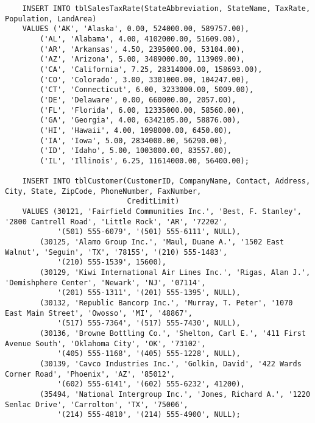 \documentclass[12pt,titlepage]{article}
\begin{document}
\begin{verbatim}
    INSERT INTO tblSalesTaxRate(StateAbbreviation, StateName, TaxRate, Population, LandArea)
    VALUES ('AK', 'Alaska', 0.00, 524000.00, 589757.00),
        ('AL', 'Alabama', 4.00, 4102000.00, 51609.00),
        ('AR', 'Arkansas', 4.50, 2395000.00, 53104.00),
        ('AZ', 'Arizona', 5.00, 3489000.00, 113909.00),
        ('CA', 'California', 7.25, 28314000.00, 158693.00),
        ('CO', 'Colorado', 3.00, 3301000.00, 104247.00),
        ('CT', 'Connecticut', 6.00, 3233000.00, 5009.00),
        ('DE', 'Delaware', 0.00, 660000.00, 2057.00),
        ('FL', 'Florida', 6.00, 12335000.00, 58560.00),
        ('GA', 'Georgia', 4.00, 6342105.00, 58876.00),
        ('HI', 'Hawaii', 4.00, 1098000.00, 6450.00),
        ('IA', 'Iowa', 5.00, 2834000.00, 56290.00),
        ('ID', 'Idaho', 5.00, 1003000.00, 83557.00),
        ('IL', 'Illinois', 6.25, 11614000.00, 56400.00);

    INSERT INTO tblCustomer(CustomerID, CompanyName, Contact, Address, City, State, ZipCode, PhoneNumber, FaxNumber,
                            CreditLimit)
    VALUES (30121, 'Fairfield Communities Inc.', 'Best, F. Stanley', '2800 Cantrell Road', 'Little Rock', 'AR', '72202',
            '(501) 555-6079', '(501) 555-6111', NULL),
        (30125, 'Alamo Group Inc.', 'Maul, Duane A.', '1502 East Walnut', 'Seguin', 'TX', '78155', '(210) 555-1483',
            '(210) 555-1539', 15600),
        (30129, 'Kiwi International Air Lines Inc.', 'Rigas, Alan J.', 'Demishphere Center', 'Newark', 'NJ', '07114',
            '(201) 555-1311', '(201) 555-1395', NULL),
        (30132, 'Republic Bancorp Inc.', 'Murray, T. Peter', '1070 East Main Street', 'Owosso', 'MI', '48867',
            '(517) 555-7364', '(517) 555-7430', NULL),
        (30136, 'Browne Bottling Co.', 'Shelton, Carl E.', '411 First Avenue South', 'Oklahoma City', 'OK', '73102',
            '(405) 555-1168', '(405) 555-1228', NULL),
        (30139, 'Cavco Industries Inc.', 'Golkin, David', '422 Wards Corner Road', 'Phoenix', 'AZ', '85012',
            '(602) 555-6141', '(602) 555-6232', 41200),
        (35494, 'National Intergroup Inc.', 'Jones, Richard A.', '1220 Senlac Drive', 'Carrolton', 'TX', '75006',
            '(214) 555-4810', '(214) 555-4900', NULL);


\end{verbatim}
\end{document}
